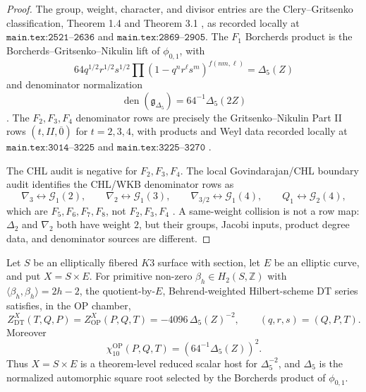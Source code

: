 \begin{proof}
The group, weight, character, and divisor entries are the
Clery--Gritsenko classification, Theorem 1.4 and Theorem 3.1
\cite{GC}, as recorded locally at
\(\texttt{main.tex:2521--2636}\) and
\(\texttt{main.tex:2869--2905}\).  The \(F_1\) Borcherds product is the
Borcherds--Gritsenko--Nikulin lift of \(\phi_{0,1}\), with
\[
64q^{1/2}r^{1/2}s^{1/2}
\prod(1-q^nr^\ell s^m)^{f(nm,\ell)}=\Delta_5(Z)
\]
and denominator normalization
\[
\operatorname{den}(\mathfrak g_{\Delta_5})
=64^{-1}\Delta_5(2Z)
\]
\cite{GN}.  The \(F_2,F_3,F_4\) denominator rows are precisely the
Gritsenko--Nikulin Part II rows \((t,II,\overline 0)\) for
\(t=2,3,4\), with products and Weyl data recorded locally at
\(\texttt{main.tex:3014--3225}\) and
\(\texttt{main.tex:3225--3270}\) \cite{GNII}.

The CHL audit is negative for \(F_2,F_3,F_4\).  The local
Govindarajan/CHL boundary audit identifies the CHL/WKB denominator rows
as
\[
\nabla_3\leftrightarrow \mathcal G_1(2),\qquad
\nabla_2\leftrightarrow \mathcal G_1(3),\qquad
\nabla_{3/2}\leftrightarrow \mathcal G_1(4),\qquad
Q_1\leftrightarrow \mathcal G_2(4),
\]
which are \(F_5,F_6,F_7,F_8\), not \(F_2,F_3,F_4\)
\cite{CD09BKM,GK09CHL,GK10Composite,Gov11BKM}.  A same-weight
collision is not a row map: \(\Delta_2\) and \(\nabla_2\) both have
weight \(2\), but their groups, Jacobi inputs, product degree data, and
denominator sources are different.
\end{proof}

\begin{theorem}
\label{thm:f1-op-dt-delta5-chain}
Let \(S\) be an elliptically fibered \(K3\) surface with section, let
\(E\) be an elliptic curve, and put \(X=S\times E\).  For primitive
non-zero \(\beta_h\in H_2(S,\mathbb Z)\) with
\(\langle\beta_h,\beta_h\rangle=2h-2\), the quotient-by-\(E\),
Behrend-weighted Hilbert-scheme DT series satisfies, in the OP chamber,
\[
Z^X_{\mathrm{DT}}(T,Q,P)
=Z^X_{\mathrm{OP}}(P,Q,T)
=-4096\,\Delta_5(Z)^{-2},
\qquad(q,r,s)=(Q,P,T).
\]
Moreover
\[
\chi_{10}^{\mathrm{OP}}(P,Q,T)
=\left(64^{-1}\Delta_5(Z)\right)^2.
\]
Thus \(X=S\times E\) is a theorem-level reduced scalar host for
\(\Delta_5^{-2}\), and \(\Delta_5\) is the normalized automorphic square
root selected by the Borcherds product of \(\phi_{0,1}\).
\end{theorem}

